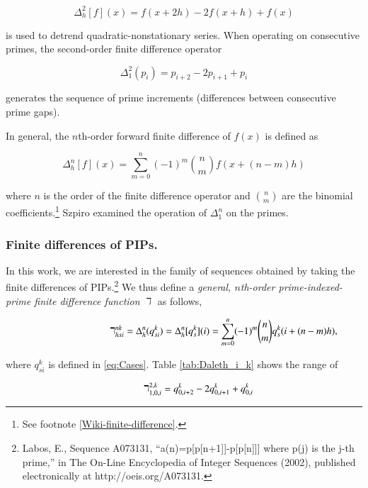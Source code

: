 \documentclass[12pt,longtitle,times]{amsart}
\begin{document}
 \begin{equation*}
\Delta_h^2 [f](x)=f(x+2h)-2f(x+h)+f(x)
 \end{equation*}
 
 is used to detrend quadratic-nonstationary series. When operating on consecutive primes, the second-order finite difference operator
 
 \begin{equation*}
 \Delta_1^2(p_i)=p_{i+2}-2p_{i+1}+p_i
 \end{equation*}
 
 generates the sequence of prime increments (differences between consecutive prime gaps).
  
 In general, the $n$th-order forward finite difference of $f(x)$ is defined as 
 
 \begin{equation*}
 \Delta_h^n[f](x)=\sum_{m=0}^{n}(-1)^m\binom{n}{m}f(x+(n-m)h)
 \end{equation*}
 
where $n$ is the order of the finite difference operator and $\binom{n}{m}$ are the binomial coefficients.\footnote{See footnote \ref{Wiki-finite-difference}.} Szpiro\cite{Szpiro-TheGaps-2004,Szpiro-Peaks-and_Gaps-2007} examined the operation of $\Delta_1^n$ on the primes.
 
\subsubsection[short]{Finite differences of PIPs.} In this work, we are interested in the family of sequences obtained by taking the finite differences of PIPs.\footnote{Labos, E., Sequence A073131, ``a(n)=p[p[n+1]]-p[p[n]]] where p(j) is the j-th prime,'' in The On-Line Encyclopedia of Integer Sequences (2002), published electronically at http://oeis.org/A073131.} We thus define a \textit{general, $n$th-order prime-indexed-prime finite difference function} $\daleth$ as follows,

\begin{equation}\label{Defn daleth}
\hphantom{----------}\daleth_{hsi}^{nk}=\Delta_h^n(q_{si}^k)=\Delta_h^n[q_{s}^k](i)=\sum_{m=0}^{n}(-1)^m\binom{n}{m}q_{s}^k(i+(n-m)h),
\end{equation}

where $q_{si}^k$ is defined in \eqref{eq:Cases}. Table \ref{tab:Daleth_i_k} shows the range of

\begin{equation*}
\hphantom{----}\daleth_{1,0,i}^{2,k}=q_{0,i+2}^k-2q_{0,i+1}^k+q_{0,i}^k
\end{equation*}
\end{document}
